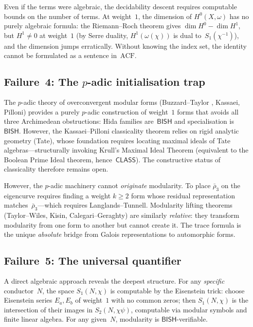 \documentclass[11pt]{article}
\theoremstyle{plain}
\theoremstyle{definition}
\theoremstyle{remark}
\newcommand{\BISH}{\mathsf{BISH}}
\newcommand{\CLASS}{\mathsf{CLASS}}
\begin{document}
Even if the terms were algebraic, the decidability descent
requires computable bounds on the number of terms.  At
weight~$1$, the dimension of $H^0(X, \omega)$ has no purely
algebraic formula: the Riemann--Roch theorem gives
$\dim H^0 - \dim H^1$, but $H^1 \ne 0$ at weight~$1$ (by
Serre duality, $H^1(\omega(\chi))$ is dual to~$S_1(\chi^{-1})$),
and the dimension jumps erratically.  Without knowing the index
set, the identity cannot be formulated as a sentence
in~$\mathrm{ACF}$.

\subsection{Failure~4: The $p$-adic initialisation trap}

The $p$-adic theory of overconvergent modular forms
(Buzzard--Taylor \cite{BuzzardTaylor1999}, Kassaei, Pilloni)
provides a purely $p$-adic construction of weight~$1$ forms
that avoids all three Archimedean obstructions: Hida families
are~$\BISH$ and specialisation is~$\BISH$.  However, the
Kassaei--Pilloni classicality theorem relies on rigid analytic
geometry (Tate), whose foundation requires locating maximal
ideals of Tate algebras---structurally invoking Krull's Maximal
Ideal Theorem (equivalent to the Boolean Prime Ideal theorem,
hence~$\CLASS$).  The constructive status of classicality
therefore remains open.

However, the $p$-adic machinery cannot \emph{originate}
modularity.  To place $\bar{\rho}_3$ on the eigencurve requires
finding a weight $k \ge 2$ form whose residual representation
matches~$\bar{\rho}_3$---which requires Langlands--Tunnell.
Modularity lifting theorems (Taylor--Wiles, Kisin,
Calegari--Geraghty) are similarly \emph{relative}: they
transform modularity from one form to another but cannot create
it.  The trace formula is the unique \emph{absolute} bridge
from Galois representations to automorphic forms.

\subsection{Failure~5: The universal quantifier}

A direct algebraic approach reveals the deepest structure.
For any \emph{specific} conductor~$N$, the space $S_1(N, \chi)$
is computable by the Eisenstein trick: choose Eisenstein series
$E_a, E_b$ of weight~$1$ with no common zeros; then $S_1(N,\chi)$
is the intersection of their images in $S_2(N,\chi\psi)$,
computable via modular symbols and finite linear algebra.
For any given~$N$, modularity is $\BISH$-verifiable.
\end{document}
